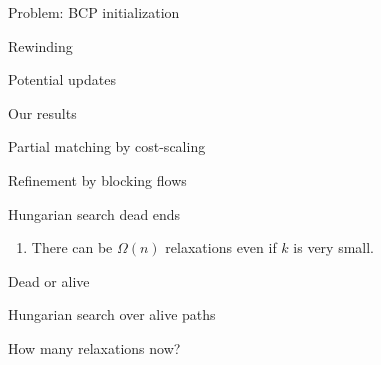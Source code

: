 \documentclass[xcolor={dvipsnames,usenames}]{beamer}
\newcommand{\eps}{\varepsilon}
\begin{document}
\begin{frame}{Problem: BCP initialization}
\end{frame}

\begin{frame}{Rewinding}
\end{frame}

\begin{frame}{Potential updates}
\end{frame}


\begin{frame}{Our results}
\end{frame}

\begin{frame}{Partial matching by cost-scaling}
\end{frame}

\begin{frame}{Refinement by blocking flows}
\end{frame}

\begin{frame}{Hungarian search dead ends}
\begin{enumerate}
\item There can be $\Omega(n)$ relaxations even if $k$ is very small.
\end{enumerate}
\end{frame}

\begin{frame}{Dead or alive}
\end{frame}

\begin{frame}{Hungarian search over alive paths}
\end{frame}

\begin{frame}{How many relaxations now?}
\end{frame}
\end{document}
